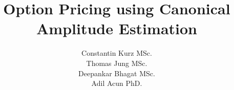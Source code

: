 \documentclass[a4paper, 12pt, one column, dvipsnames]{article}
\title{Option Pricing using Canonical Amplitude Estimation}
\author{Constantin Kurz MSc. \\ Thomas Jung MSc. \\ Deepankar Bhagat MSc.\\ Adil Acun PhD.}
\def\biblio{}
\begin{document}
\def\biblio{}
\maketitle













\end{document}
